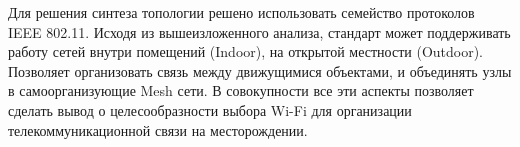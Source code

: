 Для решения синтеза топологии решено использовать семейство протоколов IEEE 802.11. Исходя из вышеизложенного анализа, стандарт может поддерживать работу сетей внутри помещений (Indoor), на открытой местности (Outdoor). Позволяет организовать связь между движущимися объектами, и объединять узлы в самоорганизующие Mesh сети. В совокупности все эти аспекты позволяет сделать вывод о целесообразности выбора Wi-Fi для организации телекоммуникационной связи на месторождении. 









